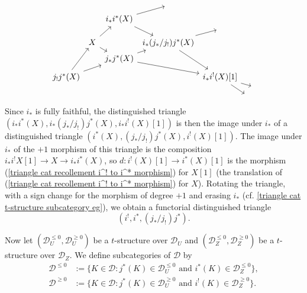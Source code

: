 \begin{equation}\label{triangle cat recollement octahedron}
\begin{tikzcd}[row sep=2pt,column sep=2pt]
&&&{}&\\
&&i_*i^*(X)\ar[ru]\ar[rdd]&&\\
&&&{}&{}\\
&X\ar[rd]\ar[ruu]&&i_*(j_*/j_!)j^*(X)\ar[ru]\ar[rddd]\\
&&j_*j^*(X)\ar[ru]\ar[rrdd]&&\\
&&&&\\
j_!j^*(X)\ar[ruuu]\ar[rruu]&&&&i_*i^!(X)[1]\ar[rdd]\ar[rrd]\\
&&&&&&{}\\
&&&&&{}&
\end{tikzcd}
\end{equation}
Since $i_*$ is fully faithful, the distinguished triangle $(i_*i^*(X),i_*(j_*/j_!)j^*(X),i_*i^!(X)[1])$ is then the image under $i_*$ of a distinguished triangle $(i^*(X),(j_*/j_!)j^*(X),i^!(X)[1])$. The image under $i_*$ of the $+1$ morphism of this triangle is the composition $i_*i^!X[1]\to X\to i_*i^*(X)$, so $d:i^!(X)[1]\to i^*(X)[1]$ is the morphism (\ref{triangle cat recollement i^! to i^* morphism}) for $X[1]$ (the translation of (\ref{triangle cat recollement i^! to i^* morphism}) for $X$). Rotating the triangle, with a sign change for the morphism of degree $+1$ and erasing $i_*$ (cf. \cref{triangle cat t-structure subcategory eg}), we obtain a functorial distinguished triangle
\begin{equation}\label{triangle cat recollement j_*/j_! dt-2}
(i^!,i^*,(j_*/j_!)j^*).
\end{equation}

Now let $(\mathcal{D}_U^{\leq 0},\mathcal{D}_U^{\geq 0})$ be a $t$-structure over $\mathcal{D}_U$ and $(\mathcal{D}_Z^{\leq 0},\mathcal{D}_Z^{\geq 0})$ be a $t$-structure over $\mathcal{D}_Z$. We define subcategories of $\mathcal{D}$ by
\begin{align*}
\mathcal{D}^{\leq 0}&:=\{K\in\mathcal{D}:\text{$j^*(K)\in\mathcal{D}_U^{\leq 0}$ and $i^*(K)\in\mathcal{D}_Z^{\leq 0}$}\},\\
\mathcal{D}^{\geq 0}&:=\{K\in\mathcal{D}:\text{$j^*(K)\in\mathcal{D}_U^{\geq 0}$ and $i^!(K)\in\mathcal{D}_Z^{\geq 0}$}\}.
\end{align*}

